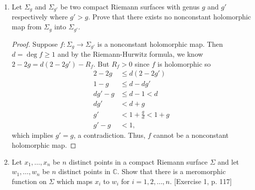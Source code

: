 \documentclass[11pt,oneside,english,reqno]{amsart}
\theoremstyle{definition}
\newcommand{\MB}[1]{\mathbb{#1}}
\begin{document}
\begin{enumerate}[leftmargin=*]
\begin{proof}
We could have used a topological argument instead, involving triangulations. Let $R$ be the set of all branch points in $X$ so that $f(R)$ is the branching locus. $f(R)$ is finite because of compactness. Now, there exists a triangulation $\triangle$ of $Y$ such that $f(R)$ is contained in the set of vertices of the triangulation. Moreover, the pullback of the triangulation $\triangle$ from $Y$ to $X$ will be a triangulation of $X$, say $\tilde\triangle$. The Euler characteristic of a triangulation of $Y$ is $\chi(Y)=V-E+F$. Each face or edge of $\triangle$ gives rise to $d$ edges or faces of $\tilde \triangle$. Additionally, outside of $f(R)$, each vertex of $\triangle$ gives rise to $d$ vertices of $\tilde\triangle$. However, at each branch point in $y\in f(R)$, the $k_x$ lifted vertices of $\tilde \triangle$ are only counted as one vertex, so we need to subtract $k_x-1$ vertices at each $x\in f^{-1}(y)$. Adding all the vertices, edges, and faces appropriately yields
\[
\chi_{\tilde \triangle}(X)=d\cdot\chi_\triangle(Y)-\sum_{\substack{x\in f^{-1}(y) \\ y\in f(R)}}k_x-1=d\cdot\chi_\triangle(Y)-R_f.
\]
\end{proof}


\item Let $\Sigma_g$ and $\Sigma_{g'}$ be two compact Riemann surfaces with genus $g$ and $g'$ respectively where $g'>g$. Prove that there exists no nonconstant holomorphic map from $\Sigma_g$ into $\Sigma_{g'}$.

\begin{proof}
Suppose $f:\Sigma_g\to\Sigma_{g'}$ is a nonconstant holomorphic map. Then $d=\deg f\geq1$ and by the Riemann-Hurwitz formula, we know $2-2g=d(2-2g')-R_f$. But $R_f>0$ since $f$ is holomorphic so
\begin{align*}
2-2g&\leq d(2-2g')\\
1-g&\leq d-dg'\\
dg'-g&\leq d-1<d\\
dg'&<d+g\\
g'&<1+\frac{g}{d}<1+g\\
g'-g&<1,
\end{align*}
which implies $g'=g$, a contradiction. Thus, $f$ cannot be a nonconstant holomorphic map.
\end{proof}


\item Let $x_1,\ldots,x_n$ be $n$ distinct points in a compact Riemann surface $\Sigma$ and let $w_1,\ldots,w_n$ be $n$ distinct points in $\MB{C}$. Show that there is a meromorphic function on $\Sigma$ which maps $x_i$ to $w_i$ for $i=1,2,\ldots,n$. [Exercise 1, p. 117]


\end{enumerate}
\end{document}
